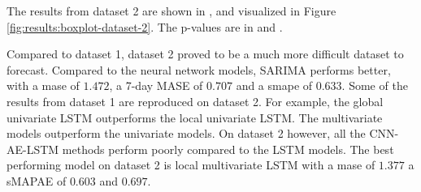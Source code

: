 The results from dataset 2 are shown in ,
and visualized in Figure \ref{fig:results:boxplot-dataset-2}. The p-values
are in  and
.

Compared to dataset 1, dataset 2 proved to be a much more difficult dataset to forecast.
Compared to the neural network models, SARIMA performs better, with a mase of $1.472$, a 7-day MASE of $0.707$ and a smape of $0.633$.
Some of the results from dataset 1 are reproduced on dataset 2. For example, the global univariate LSTM outperforms
the local univariate LSTM. The multivariate models outperform the univariate models.
On dataset 2 however, all the CNN-AE-LSTM methods perform poorly compared to the LSTM models.
The best performing model on dataset 2 is local multivariate LSTM with a mase of $1.377$ a sMAPAE of $0.603$
and $0.697$.

